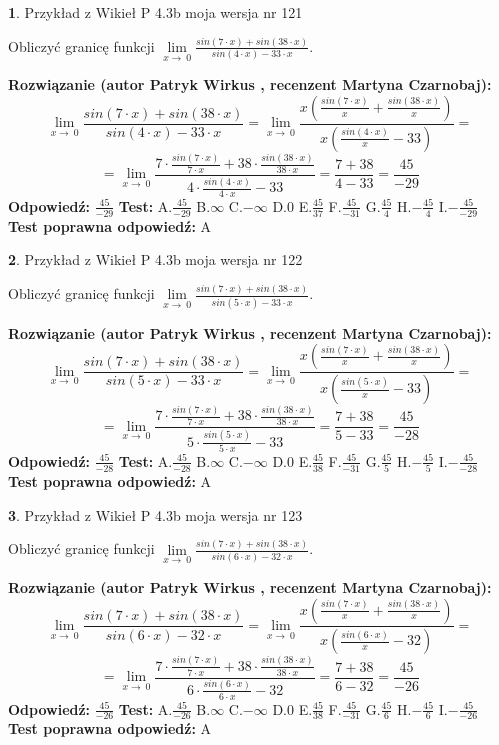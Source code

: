 \documentclass[12pt, a4paper]{article}
\theoremstyle{definition} %
\newtheorem{zad}{}
\newcommand{\zadStart}[1]{\begin{zad}#1\newline}
\newcommand{\zadStop}{\end{zad}}
\newcommand{\rozwStart}[2]{\noindent \textbf{Rozwiązanie (autor #1 , recenzent #2): }\newline}
\newcommand{\rozwStop}{\newline}
\newcommand{\odpStart}{\noindent \textbf{Odpowiedź:}\newline}
\newcommand{\odpStop}{\newline}
\newcommand{\testStart}{\noindent \textbf{Test:}\newline}
\newcommand{\testStop}{\newline}
\newcommand{\kluczStart}{\noindent \textbf{Test poprawna odpowiedź:}\newline}
\newcommand{\kluczStop}{\newline}
\begin{document}
\zadStart{Przykład z Wikieł P 4.3b moja wersja nr 121}


Obliczyć granicę funkcji $\lim\limits_{x\to\ 0}\frac{sin(7 \cdot x)+sin(38 \cdot x)}{sin(4 \cdot x)-33 \cdot x}$.
\zadStop
\rozwStart{Patryk Wirkus}{Martyna Czarnobaj}
$$\lim\limits_{x\to\ 0}\frac{sin(7 \cdot x)+sin(38 \cdot x)}{sin(4 \cdot x)-33 \cdot x}=\lim\limits_{x\to\ 0}\frac{x(\frac{sin(7 \cdot x)}{x}+\frac{sin(38 \cdot x)}{x})}{x(\frac{sin(4 \cdot x)}{x}-33)}=$$
$$=\lim\limits_{x\to\ 0}\frac{7 \cdot \frac{sin(7 \cdot x)}{7 \cdot x}+38 \cdot \frac{sin(38 \cdot x)}{38 \cdot x}}{4 \cdot \frac{sin(4 \cdot x)}{4 \cdot x}-33}=\frac{7+38}{4-33} = \frac{45}{-29}$$
\rozwStop
\odpStart
$\frac{45}{-29}$
\odpStop
\testStart
A.$\frac{45}{-29}$
B.$\infty$
C.$-\infty$
D.$0$
E.$\frac{45}{37}$
F.$\frac{45}{-31}$
G.$\frac{45}{4}$
H.$-\frac{45}{4}$
I.$-\frac{45}{-29}$
\testStop
\kluczStart
A
\kluczStop



\zadStart{Przykład z Wikieł P 4.3b moja wersja nr 122}


Obliczyć granicę funkcji $\lim\limits_{x\to\ 0}\frac{sin(7 \cdot x)+sin(38 \cdot x)}{sin(5 \cdot x)-33 \cdot x}$.
\zadStop
\rozwStart{Patryk Wirkus}{Martyna Czarnobaj}
$$\lim\limits_{x\to\ 0}\frac{sin(7 \cdot x)+sin(38 \cdot x)}{sin(5 \cdot x)-33 \cdot x}=\lim\limits_{x\to\ 0}\frac{x(\frac{sin(7 \cdot x)}{x}+\frac{sin(38 \cdot x)}{x})}{x(\frac{sin(5 \cdot x)}{x}-33)}=$$
$$=\lim\limits_{x\to\ 0}\frac{7 \cdot \frac{sin(7 \cdot x)}{7 \cdot x}+38 \cdot \frac{sin(38 \cdot x)}{38 \cdot x}}{5 \cdot \frac{sin(5 \cdot x)}{5 \cdot x}-33}=\frac{7+38}{5-33} = \frac{45}{-28}$$
\rozwStop
\odpStart
$\frac{45}{-28}$
\odpStop
\testStart
A.$\frac{45}{-28}$
B.$\infty$
C.$-\infty$
D.$0$
E.$\frac{45}{38}$
F.$\frac{45}{-31}$
G.$\frac{45}{5}$
H.$-\frac{45}{5}$
I.$-\frac{45}{-28}$
\testStop
\kluczStart
A
\kluczStop



\zadStart{Przykład z Wikieł P 4.3b moja wersja nr 123}


Obliczyć granicę funkcji $\lim\limits_{x\to\ 0}\frac{sin(7 \cdot x)+sin(38 \cdot x)}{sin(6 \cdot x)-32 \cdot x}$.
\zadStop
\rozwStart{Patryk Wirkus}{Martyna Czarnobaj}
$$\lim\limits_{x\to\ 0}\frac{sin(7 \cdot x)+sin(38 \cdot x)}{sin(6 \cdot x)-32 \cdot x}=\lim\limits_{x\to\ 0}\frac{x(\frac{sin(7 \cdot x)}{x}+\frac{sin(38 \cdot x)}{x})}{x(\frac{sin(6 \cdot x)}{x}-32)}=$$
$$=\lim\limits_{x\to\ 0}\frac{7 \cdot \frac{sin(7 \cdot x)}{7 \cdot x}+38 \cdot \frac{sin(38 \cdot x)}{38 \cdot x}}{6 \cdot \frac{sin(6 \cdot x)}{6 \cdot x}-32}=\frac{7+38}{6-32} = \frac{45}{-26}$$
\rozwStop
\odpStart
$\frac{45}{-26}$
\odpStop
\testStart
A.$\frac{45}{-26}$
B.$\infty$
C.$-\infty$
D.$0$
E.$\frac{45}{38}$
F.$\frac{45}{-31}$
G.$\frac{45}{6}$
H.$-\frac{45}{6}$
I.$-\frac{45}{-26}$
\testStop
\kluczStart
A
\kluczStop
\end{document}
